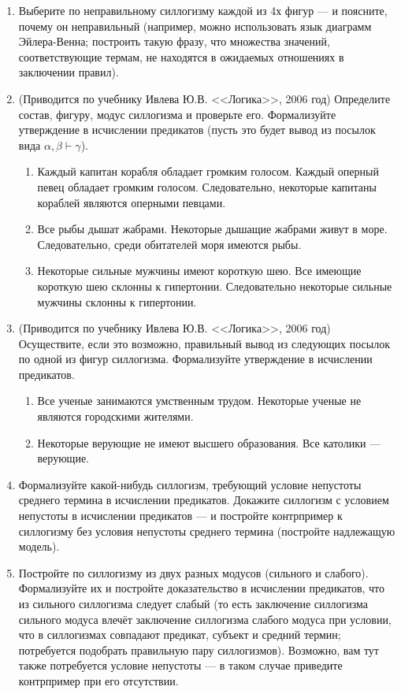 \documentclass[10pt,a4paper,oneside]{article}
\begin{document}
\begin{enumerate}
\item Выберите по неправильному силлогизму каждой из 4х фигур --- и поясните, почему он неправильный (например, можно использовать
язык диаграмм Эйлера-Венна; построить такую фразу, что множества значений, соответствующие термам, не находятся в ожидаемых
отношениях в заключении правил).
\item (Приводится по учебнику Ивлева Ю.В. <<Логика>>, 2006 год) Определите состав, фигуру, модус силлогизма и проверьте его.
Формализуйте утверждение в исчислении предикатов (пусть это будет вывод из посылок вида $\alpha,\beta\vdash\gamma$).
\begin{enumerate}
\item Каждый капитан корабля обладает громким голосом. Каждый оперный певец обладает громким голосом. Следовательно, некоторые капитаны кораблей являются оперными певцами.
\item Все рыбы дышат жабрами. Некоторые дышащие жабрами живут в море. Следовательно, среди обитателей моря имеются рыбы.
\item Некоторые сильные мужчины имеют короткую шею. Все имеющие короткую шею склонны к гипертонии. Следовательно некоторые сильные мужчины склонны к гипертонии.
\end{enumerate}
\item (Приводится по учебнику Ивлева Ю.В. <<Логика>>, 2006 год) Осуществите, если это возможно, правильный вывод из следующих посылок по одной из фигур силлогизма. 
Формализуйте утверждение в исчислении предикатов.
\begin{enumerate}
\item Все ученые занимаются умственным трудом. Некоторые ученые не являются городскими жителями.
\item Некоторые верующие не имеют высшего образования. Все католики --- верующие.
\end{enumerate}
\item Формализуйте какой-нибудь силлогизм, требующий условие непустоты среднего термина в исчислении предикатов. 
Докажите силлогизм с условием непустоты в исчислении предикатов --- и постройте контрпример к силлогизму без 
условия непустоты среднего термина (постройте надлежащую модель).
\item Постройте по силлогизму из двух разных модусов (сильного и слабого). Формализуйте их и постройте доказательство в исчислении предикатов, что из сильного силлогизма следует слабый 
(то есть заключение силлогизма сильного модуса влечёт заключение силлогизма слабого модуса при условии, что в силлогизмах совпадают предикат, субъект и средний термин;
потребуется подобрать правильную пару силлогизмов). 
Возможно, вам тут также потребуется условие непустоты --- в таком случае приведите контрпример при его отсутствии.


\end{enumerate}
\end{document}
